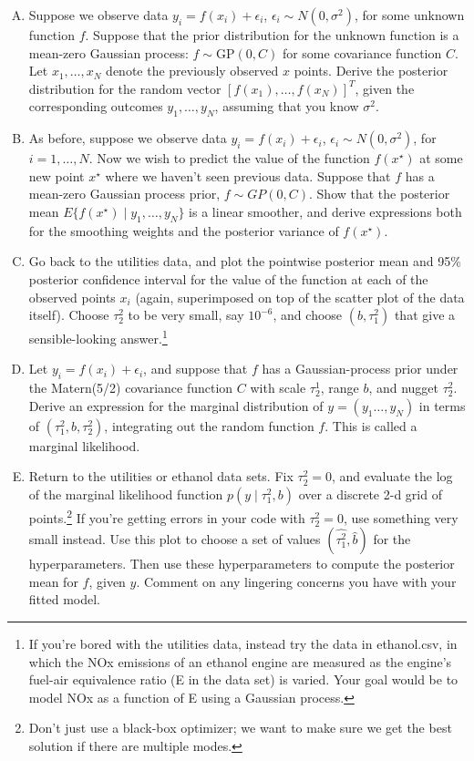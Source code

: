 \documentclass[11pt]{article}
\begin{document}
\begin{enumerate}[(A)]

\item Suppose we observe data $y_i = f(x_i) + \epsilon_i$, $\epsilon_i \sim N(0, \sigma^2)$, for some unknown function $f$. Suppose that the prior distribution for the unknown function is a mean-zero Gaussian process: $f \sim \mbox{GP}(0, C)$ for some covariance function $C$.  Let $x_1, \ldots, x_N$ denote the previously observed $x$ points.  Derive the posterior distribution for the random vector $[f(x_1), \ldots, f(x_N)]^T$, given the corresponding outcomes $y_1, \ldots, y_N$, assuming that you know $\sigma^2$.

\item As before, suppose we observe data $y_i = f(x_i) + \epsilon_i$, $\epsilon_i \sim N(0, \sigma^2)$, for $i=1, \ldots, N$.  Now we wish to predict the value of the function $f(x^{\star})$ at some new point $x^{\star}$ where we haven't seen previous data.  Suppose that $f$ has a mean-zero Gaussian process prior, $f \sim GP(0, C)$.  Show that the posterior mean $E\{ f(x^{\star}) \mid y_1, \ldots, y_N \}$ is a linear smoother, and derive expressions both for the smoothing weights and the posterior variance of $f(x^{\star})$.

\item Go back to the utilities data, and plot the pointwise posterior mean and 95\% posterior confidence interval for the value of the function at each of the observed points $x_i$ (again, superimposed on top of the scatter plot of the data itself).  Choose $\tau^2_2$ to be very small, say $10^{-6}$, and choose $(b, \tau^2_1)$ that give a sensible-looking answer.\footnote{If you're bored with the utilities data, instead try the data in ethanol.csv, in which the NOx emissions of an ethanol engine are measured as the engine's fuel-air equivalence ratio (E in the data set) is varied.  Your goal would be to model NOx as a function of E using a Gaussian process. }

\item Let $y_i = f(x_i) + \epsilon_i$, and suppose that $f$ has a Gaussian-process prior under the Matern(5/2) covariance function $C$ with scale $\tau^1_2$, range $b$, and nugget $\tau^2_2$.  Derive an expression for the marginal distribution of $y = (y_1 \ldots, y_N)$ in terms of $(\tau^2_1, b, \tau^2_2)$, integrating out the random function $f$.  This is called a marginal likelihood.

\item Return to the utilities or ethanol data sets. Fix $\tau^2_2 = 0$, and evaluate the log of the marginal likelihood function $p(y \mid \tau^2_1, b)$ over a discrete 2-d grid of points.\footnote{Don't just use a black-box optimizer; we want to make sure we get the best solution if there are multiple modes.} If you're getting errors in your code with $\tau^2_2 = 0$, use something very small instead.  Use this plot to choose a set of values $(\hat{\tau^2_1}, \hat{b})$ for the hyperparameters.  Then use these hyperparameters to compute the posterior mean for $f$, given $y$.  Comment on any lingering concerns you have with your fitted model.


\end{enumerate}
\end{document}
